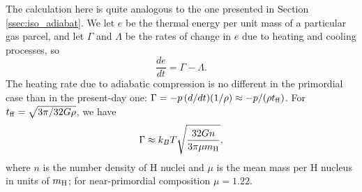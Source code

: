 The calculation here is quite analogous to the one presented in Section \ref{ssec:iso_adiabat}. We
let $e$ be the thermal energy per unit mass of a particular gas parcel, and let $\Gamma$ and $\Lambda$ be the rates of change in $e$ due to heating and cooling processes, so
\begin{equation}
\frac{de}{dt} = \Gamma - \Lambda.
\end{equation}
The heating rate due to adiabatic compression is no different in the primordial case than in the present-day one: $\Gamma = -p\, (d/dt) (1/\rho) \approx -p/(\rho t_{\rm ff})$. For $t_{\rm ff} = \sqrt{3\pi/32G\rho}$, we have
\begin{equation}
\label{eq:gamma_ad_firststar}
\Gamma \approx k_B T \sqrt{\frac{32 G n}{3\pi \mu m_{\rm H}}},
\end{equation}
where $n$ is the number density of H nuclei and $\mu$ is the mean mass per H nucleus in units of $m_{\rm H}$; for near-primordial composition $\mu = 1.22$.

